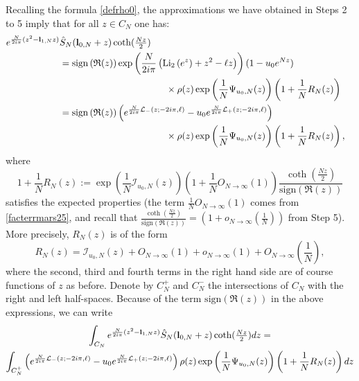 \documentclass[11pt]{amsart}
\newcommand{\bl}{{\bf l}}
\newcommand{\ra}{\rightarrow}
\begin{document}
{Recalling the formula \eqref{defrho0}, the approximations we have obtained 
in Steps 2 to 5
imply that for all $z\in C_N$ one has:
\begin{align*}
e^{\frac{N}{2i\pi} (z^2 - \bl_{1,N}z)} & \hat S_N(\bl_{0,N} + z)\textstyle \coth(\frac{Nz}{2}) & \\
& = 
	\mathrm{sign}\left(\mathfrak{R}(z)\right)
	\exp\left(\frac{N}{2i\pi}\left({\rm Li}_2\left(e^{z}\right)+ z^2 - \ell z\right)\right){(1-u_0 e^{Nz})}\\ &\hspace*{4cm} \times \rho(z)    \exp\left(\frac{1}{N}{\Psi_{u_0,N}(z)}\right) \left(1 + \frac{1}{N}R_N(z)\right) 
\\ 
& = \mathrm{sign}\left(\mathfrak{R}(z)\right) 
\left( e^{\frac{N}{2i\pi} \mathcal{L}_{-}(z;-2i\pi,\ell)} - u_0 e^{\frac{N}{2i\pi} \mathcal{L}_{+}(z;-2i\pi,\ell)}\right) \\ & \hspace*{4cm} \times \rho(z)   \exp\left(\frac{1}{N}{\Psi_{u_0,N}(z)}\right) \left(1 + \frac{1}{N}R_N(z)\right),
\end{align*}
where
\begin{equation}\label{defRNjanv26}
1+\frac{1}{N}R_N(z) := \exp\left(\frac{1}{N}{\mathcal{I}_{u_0,N}(z)}\right)\left(1+\frac{1}{N}O_{N\ra \infty}\left(1\right)\right)
{
\dfrac{ \coth\left(\frac{Nz}{2}\right) }{ \mathrm{sign}\left(\mathfrak{R}(z)\right)}
}
\end{equation} satisfies the expected properties (the term $\textstyle \frac{1}{N}O_{N\ra \infty}(1)$ comes from \eqref{facterrmars25}, and recall that $\textstyle \frac{ \coth\left(\frac{Nz}{2}\right) }{ \mathrm{sign}\left(\mathfrak{R}(z)\right)}= \left(1+ o_{N\ra \infty}\left(\frac{1}{N}\right)\right)$
 from Step 5). More precisely, $R_N(z)$ is of the form
$$R_N(z)= \mathcal{I}_{u_0,N}(z)+O_{N\ra \infty}\left(1\right)+o_{N\ra \infty}\left(1\right) +O_{N\ra \infty}\left(\frac{1}{N}\right),$$
where the second, third and fourth terms in the right hand side are of course functions of $z$ as before. Denote by $C^+_N$ and $C^-_N$ the intersections of $C_N$ with the right and left half-spaces. Because of the term $\textstyle \mathrm{sign}\left(\mathfrak{R}(z)\right)$ in the above expressions, we can write
\begin{multline*} \int_{C_N} e^{\frac{N}{2i\pi}(z^2 - \bl_{1,N}z)}\hat S_N(\bl_{0,N} + z)\textstyle \coth(\frac{Nz}{2}) dz = 
			  \\
\int_{C^+_N} \left( e^{\frac{N}{2i\pi} \mathcal{L}_{-}(z;-2i\pi,\ell)} - u_0 e^{\frac{N}{2i\pi} \mathcal{L}_{+}(z;-2i\pi,\ell)}\right) \rho(z) \exp\left(\frac{1}{N}{\Psi_{u_0,N}(z)}\right) \left(1 + \frac{1}{N}R_N(z)\right) dz\\

\end{multline*}}
\end{document}
